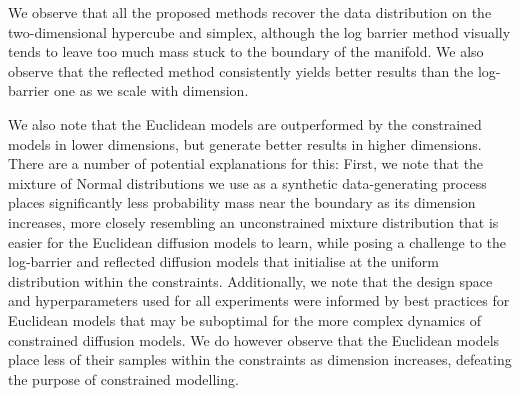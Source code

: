 We observe that all the proposed methods recover the data distribution on the two-dimensional hypercube and simplex, although the log barrier method visually tends to leave too much mass stuck to the boundary of the manifold.
We also observe that the reflected method consistently yields better results than the log-barrier one as we scale with dimension.

We also note that the Euclidean models are outperformed by the constrained models in lower dimensions, but generate better results in higher dimensions.
There are a number of potential explanations for this: First, we note that the mixture of Normal distributions we use as a synthetic data-generating process places significantly less probability mass near the boundary as its dimension increases, more closely resembling an unconstrained mixture distribution that is easier for the Euclidean diffusion models to learn, while posing a challenge to the log-barrier and reflected diffusion models that initialise at the uniform distribution within the constraints.
Additionally, we note that the design space and hyperparameters used for all experiments were informed by best practices for Euclidean models that may be suboptimal for the more complex dynamics of constrained diffusion models.
We do however observe that the Euclidean models place less of their samples within the constraints as dimension increases, defeating the purpose of constrained modelling.

